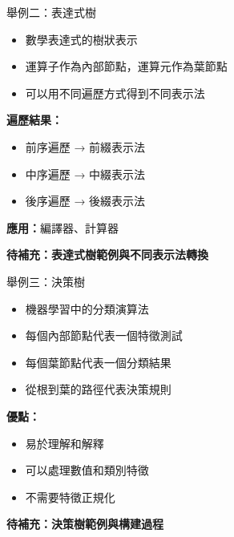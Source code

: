 \documentclass{beamer}
\begin{document}
\begin{frame}{舉例二：表達式樹}
\begin{itemize}
    \item 數學表達式的樹狀表示
    \item 運算子作為內部節點，運算元作為葉節點
    \item 可以用不同遍歷方式得到不同表示法
\end{itemize}

\vspace{1em}
\textbf{遍歷結果：}
\begin{itemize}
    \item 前序遍歷 → 前綴表示法
    \item 中序遍歷 → 中綴表示法
    \item 後序遍歷 → 後綴表示法
\end{itemize}

\vspace{1em}
\textbf{應用：}編譯器、計算器

\vspace{1em}
\textbf{待補充：表達式樹範例與不同表示法轉換}
\end{frame}

\begin{frame}{舉例三：決策樹}
\begin{itemize}
    \item 機器學習中的分類演算法
    \item 每個內部節點代表一個特徵測試
    \item 每個葉節點代表一個分類結果
    \item 從根到葉的路徑代表決策規則
\end{itemize}

\vspace{1em}
\textbf{優點：}
\begin{itemize}
    \item 易於理解和解釋
    \item 可以處理數值和類別特徵
    \item 不需要特徵正規化
\end{itemize}

\vspace{1em}
\textbf{待補充：決策樹範例與構建過程}
\end{frame}
\end{document}
